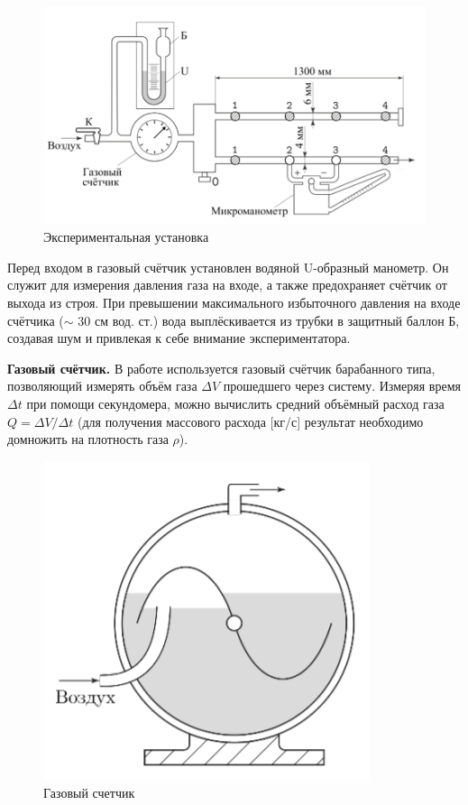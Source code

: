 \documentclass[a4paper, 12pt]{article}
\begin{document}
\begin{figure}[H]
    \centering
    \includegraphics[scale=0.65]{expust.PNG}
    \caption{Экспериментальная установка}
    \label{233}
\end{figure}

Перед входом в газовый счётчик установлен водяной U-образный манометр. Он служит для измерения давления газа на входе, а также предохраняет
счётчик от выхода из строя. При превышении максимального избыточного
давления на входе счётчика ($\sim$ 30 см вод. ст.) вода выплёскивается из трубки
в защитный баллон Б, создавая шум и привлекая к себе внимание экспериментатора.


\textbf{Газовый счётчик.} В работе используется газовый счётчик барабанного
типа, позволяющий измерять объём газа $\Delta V$ прошедшего через систему. Измеряя время $\Delta t$ при помощи секундомера, можно вычислить средний объёмный расход газа $Q = \Delta V/ \Delta t$ (для получения массового расхода [кг/с] результат
необходимо домножить на плотность газа $\rho$).

\begin{figure}[H]
    \centering
    \includegraphics[scale=0.65]{gascounter.PNG}
    \caption{Газовый счетчик}
    \label{333}
\end{figure}
\end{document}
